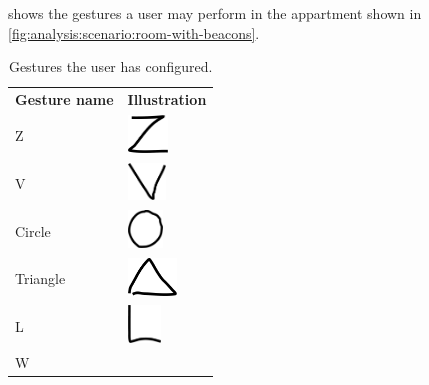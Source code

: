  shows the gestures a user may perform in the appartment shown in \cref{fig:analysis:scenario:room-with-beacons}.

\begin{table}[h!]
\centering
\caption{Gestures the user has configured.}
\label{tbl:analysis:scenario:gestures}
\begin{tabular}{ll}
\textbf{Gesture name} & \textbf{Illustration}
\\[0.2cm]
Z                     &  
\begin{minipage}{.3\textwidth}
  \includegraphics[height=1cm]{images/gesture-z}
\end{minipage}
\\[0.5cm]
V                     &
\begin{minipage}{.3\textwidth}
  \includegraphics[height=1cm]{images/gesture-v}
\end{minipage}
\\[0.5cm]
Circle                &
\begin{minipage}{.3\textwidth}
  \includegraphics[height=1cm]{images/gesture-circle}
\end{minipage}
\\[0.5cm]
Triangle              &
\begin{minipage}{.3\textwidth}
  \includegraphics[height=1cm]{images/gesture-triangle}
\end{minipage}
\\[0.5cm]
L                     &
\begin{minipage}{.3\textwidth}
  \includegraphics[height=1cm]{images/gesture-l}
\end{minipage}
\\[0.5cm]
W                     &

\end{tabular}
\end{table}
